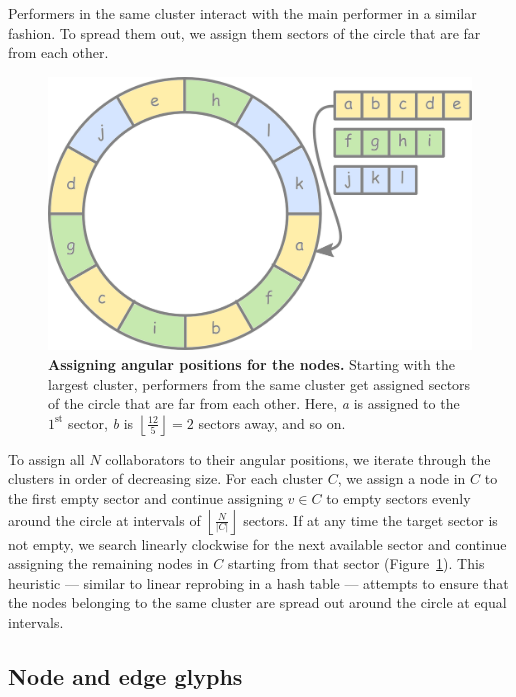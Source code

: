 \documentclass[12pt]{cmuthesis}
\begin{document}
  Performers in the same cluster interact with the main performer in a similar fashion. To spread them out, we assign them sectors of the circle that are far from each other.
  \begin{figure}[ht]
    \centering
    \includegraphics[width=0.6\linewidth]{figures/ordering}
    \caption{\textbf{Assigning angular positions for the nodes.} Starting with the largest cluster, performers from the same cluster get assigned sectors of the circle that are far from each other. Here, \emph{a} is assigned to the $1^\textrm{st}$ sector, \emph{b} is $\left\lfloor \frac{12}{5} \right\rfloor = 2$ sectors away, and so on.}
    \label{fig:moj:ordering}
  \end{figure}
  To assign all $N$ collaborators to their angular positions, we iterate through the clusters in order of decreasing size.  For each cluster $C$, we assign a node in $C$ to the first empty sector and continue assigning $v \in C$ to empty sectors evenly around the circle at intervals of $\left\lfloor\frac{N}{|C|}\right\rfloor$ sectors.  If at any time the target sector is not empty, we search linearly clockwise for the next available sector and continue assigning the remaining nodes in $C$ starting from that sector (Figure~\ref{fig:moj:ordering}). This heuristic --- similar to linear reprobing in a hash table --- attempts to ensure that the nodes belonging to the same cluster are spread out around the circle at equal intervals.


  \subsection{Node and edge glyphs}
\end{document}
